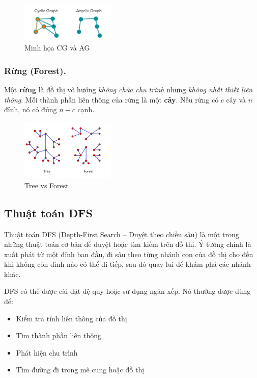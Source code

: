 \documentclass{article}
\begin{document}
\begin{figure}[H]
    \centering
    \includegraphics[width=0.4\textwidth]{img/b1/CGvsAG.png}
    \caption{Minh họa CG và AG}

\end{figure}
\subsubsection{Rừng (Forest).}
Một \textbf{rừng} là đồ thị vô hướng \emph{không chứa chu trình} nhưng \emph{không nhất thiết liên thông}.  
Mỗi thành phần liên thông của rừng là một \textbf{cây}.  
Nếu rừng có \(c\) cây và \(n\) đỉnh, nó có đúng \(n-c\) cạnh.


\begin{figure}[H]
    \centering
    \includegraphics[width=0.4\textwidth]{img/b1/treevsforest.jpg}
    \caption{Tree vs Forest}    
\end{figure}


\subsection{Thuật toán DFS}

Thuật toán DFS (Depth-First Search – Duyệt theo chiều sâu) là một trong những thuật toán cơ bản để duyệt hoặc tìm kiếm trên đồ thị. Ý tưởng chính là xuất phát từ một đỉnh ban đầu, đi sâu theo từng nhánh con của đồ thị cho đến khi không còn đỉnh nào có thể đi tiếp, sau đó quay lui để khám phá các nhánh khác.

DFS có thể được cài đặt đệ quy hoặc sử dụng ngăn xếp. Nó thường được dùng để:

\begin{itemize}
    \item Kiểm tra tính liên thông của đồ thị
    \item Tìm thành phần liên thông
    \item Phát hiện chu trình
    \item Tìm đường đi trong mê cung hoặc đồ thị
\end{itemize}
\end{document}
